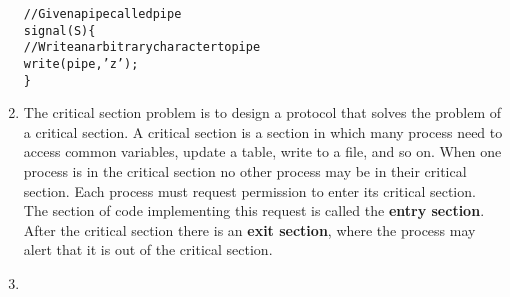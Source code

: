 \documentclass{article}
\begin{document}
\begin{enumerate}
  \begin{alltt}
    // Given a pipe called pipe
    signal(S) \{
      // Write an arbitrary character to pipe
      write(pipe,'z');
    \}
  \end{alltt}
\item The critical section problem is to design a protocol that solves the problem of a critical section. A critical section is a section in which many process need to access common variables, update a table, write to a file, and so on. When one process is in the critical section no other process may be in their critical section. Each process must request permission to enter its critical section. The section of code implementing this request is called the \textbf{entry section}. After the critical section there is an \textbf{exit section}, where the process may alert that it is out of the critical section.
\item 

\end{enumerate}
\end{document}
